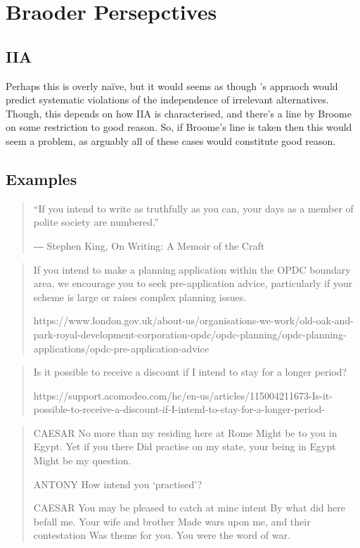 \documentclass[10pt]{article}
\begin{document}
\section{Braoder Persepctives}
\label{sec:braoder-persepctives}

\subsection{IIA}
\label{sec:iia-1}

Perhaps this is overly na\"{i}ve, but it would seems as though \citeauthor{Bratman:1987aa}'s appraoch would predict systematic violations of the independence of irrelevant alternatives.
Though, this depends on how IIA is characterised, and there's a line by Broome on some restriction to good reason.
So, if Broome's line is taken then this would seem a problem, as arguably all of these cases would constitute good reason.



\subsection{Examples}
\label{sec:examples}


\begin{quote}
  “If you intend to write as truthfully as you can, your days as a member of polite society are numbered.”


― Stephen King, On Writing: A Memoir of the Craft
\end{quote}


\begin{quote}
  If you intend to make a planning application within the OPDC boundary area, we encourage you to seek pre-application advice, particularly if your scheme is large or raises complex planning issues.

  https://www.london.gov.uk/about-us/organisations-we-work/old-oak-and-park-royal-development-corporation-opdc/opdc-planning/opdc-planning-applications/opdc-pre-application-advice
\end{quote}

\begin{quote}
  Is it possible to receive a discount if I intend to stay for a longer period?

  https://support.acomodeo.com/hc/en-us/articles/115004211673-Is-it-possible-to-receive-a-discount-if-I-intend-to-stay-for-a-longer-period-
\end{quote}


\begin{quote}
  CAESAR No more than my residing here at Rome Might be to you in Egypt. Yet if you there Did practise on my state, your being in Egypt Might be my question.

ANTONY How intend you ‘practised’?

CAESAR You may be pleased to catch at mine intent By what did here befall me. Your wife and brother Made wars upon me, and their contestation Was theme for you. You were the word of war.
\end{quote}
\end{document}
